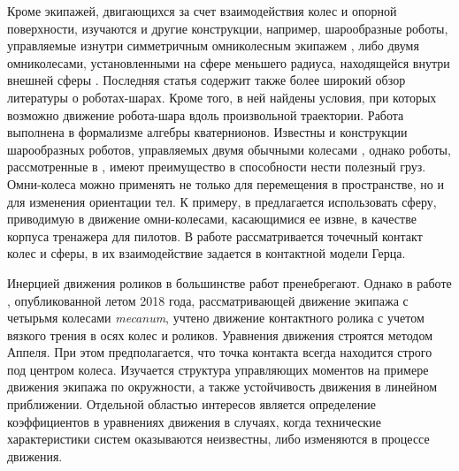 Кроме экипажей, двигающихся за счет взаимодействия колес и опорной поверхности, изучаются и другие конструкции, например, шарообразные роботы, управляемые изнутри симметричным омниколесным экипажем \cite{Karavaev2015},
либо двумя омниколесами,  установленными на сфере меньшего радиуса, находящейся внутри внешней сферы \cite{Ivanov2015a}. Последняя статья содержит также более широкий обзор литературы о роботах-шарах. Кроме того, в ней найдены условия, при которых возможно движение робота-шара вдоль произвольной траектории. Работа выполнена в формализме алгебры кватернионов. Известны и конструкции шарообразных роботов, управляемых двумя обычными колесами \cite{Zhan2011}, однако роботы, рассмотренные в \cite{Ivanov2015a}, имеют преимущество в способности нести полезный груз. Омни-колеса можно применять не только для перемещения в пространстве, но и для изменения ориентации тел. К примеру, в \cite{Weiss2015,Plumpton2014} предлагается использовать сферу, приводимую в движение омни-колесами, касающимися ее извне, в качестве корпуса тренажера для пилотов. В работе \cite{Plumpton2014} рассматривается точечный контакт колес и сферы, в \cite{Weiss2015} их взаимодействие задается в контактной модели Герца.

Инерцией движения роликов в большинстве работ  пренебрегают. Однако в работе \cite{Adamov2018}, опубликованной летом 2018 года, рассматривающей движение экипажа с четырьмя колесами \textit{mecanum}, учтено движение контактного ролика с учетом вязкого трения в осях колес и роликов. Уравнения движения строятся методом Аппеля. При этом предполагается, что точка контакта всегда находится строго под центром колеса. Изучается структура управляющих моментов на примере движения экипажа по окружности, а также устойчивость движения в линейном приближении. Отдельной областью интересов является определение коэффициентов в уравнениях движения \cite{Adamov2018a} в случаях, когда технические характеристики систем оказываются неизвестны, либо изменяются в процессе движения.

